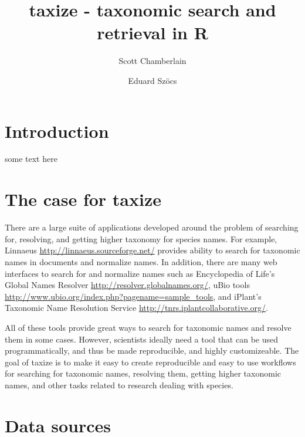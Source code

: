\documentclass[letterpaper,superscriptaddress,showkeys,longbibliography]{revtex4-1}
\begin{document}
\title{taxize - taxonomic search and retrieval in R}

\author{Scott Chamberlain}

\author{Eduard Sz\"{o}cs}


\maketitle

\section{Introduction}

some text here

\section{The case for taxize}

There are a large suite of applications developed around the problem of searching for, resolving, and getting higher taxonomy for species names. For example, Linnaeus \url{http://linnaeus.sourceforge.net/} provides ability to search for taxonomic names in documents and normalize names. In addition, there are many web interfaces to search for and normalize names such as Encyclopedia of Life's Global Names Resolver \url{http://resolver.globalnames.org/}, uBio tools \url{http://www.ubio.org/index.php?pagename=sample_tools}, and iPlant's Taxonomic Name Resolution Service \url{http://tnrs.iplantcollaborative.org/}. 

All of these tools provide great ways to search for taxonomic names and resolve them in some cases. However, scientists ideally need a tool that can be used programmatically, and thus be made reproducible, and highly customizeable. The goal of taxize is to make it easy to create reproducible and easy to use workflows for searching for taxonomic names, resolving them, getting higher taxonomic names, and other tasks related to research dealing with species. 

\section{Data sources}
\end{document}
